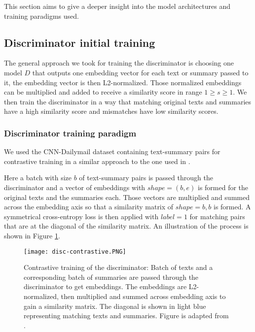 \documentclass[11pt]{article}
\begin{document}
This section aims to give a deeper insight into the model architectures and training paradigms used.

\subsection{Discriminator initial training}

The general approach we took for training the discriminator is choosing one model $D$ that outputs one embedding vector for each text or summary passed to it, the embedding vector is then L2-normalized. Those normalized embeddings can be multiplied and added to receive a similarity score in range $1 \geq s \geq 1$. We then train the discriminator in a way that matching original texts and summaries have a high similarity score and mismatches have low similarity scores. 

\subsubsection{Discriminator training paradigm}

We used the CNN-Dailymail dataset \cite{nallapati2016abstractive} containing text-summary pairs for contrastive training in a similar approach to the one used in \cite{radford2021learning}. 

Here a batch with size $b$ of text-summary pairs is passed through the discriminator and a vector of embeddings with $shape=(b,e)$ is formed for the original texts and the summaries each. Those vectors are multiplied and summed across the embedding axis so that a similarity matrix of $shape=b,b$ is formed. A symmetrical cross-entropy loss is then applied with $label=1$ for matching pairs that are at the diagonal of the similarity matrix. An illustration of the process is shown in Figure \ref{fig:disc_c}.


\begin{figure}[h]
\centering
\begin{minipage}[t]{1\linewidth}
\texttt{[image: disc-contrastive.PNG]}
\end{minipage}
\centering
\caption{Contrastive training of the discriminator: Batch of texts and a corresponding batch of summaries are passed through the discriminator to get embeddings. The embeddings are L2-normalized, then multiplied and summed across embedding axis to gain a similarity matrix. The diagonal is shown in light blue representing matching texts and summaries. Figure is adapted from \cite{radford2021learning}.}
\label{fig:disc_c}
\end{figure} 
\end{document}
